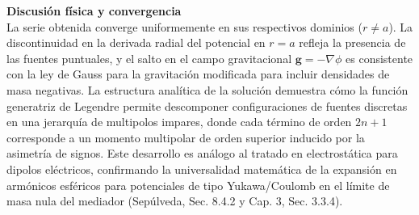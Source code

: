\documentclass[a4paper]{article}
\begin{document}
\vspace{0.3cm}
\noindent\textbf{Discusión física y convergencia}\\
La serie obtenida converge uniformemente en sus respectivos dominios ($r \neq a$). La discontinuidad en la derivada radial del potencial en $r=a$ refleja la presencia de las fuentes puntuales, y el salto en el campo gravitacional $\mathbf{g} = -\nabla\phi$ es consistente con la ley de Gauss para la gravitación modificada para incluir densidades de masa negativas. La estructura analítica de la solución demuestra cómo la función generatriz de Legendre permite descomponer configuraciones de fuentes discretas en una jerarquía de multipolos impares, donde cada término de orden $2n+1$ corresponde a un momento multipolar de orden superior inducido por la asimetría de signos. Este desarrollo es análogo al tratado en electrostática para dipolos eléctricos, confirmando la universalidad matemática de la expansión en armónicos esféricos para potenciales de tipo Yukawa/Coulomb en el límite de masa nula del mediador (Sepúlveda, Sec. 8.4.2 y Cap. 3, Sec. 3.3.4).


 
\end{document}

